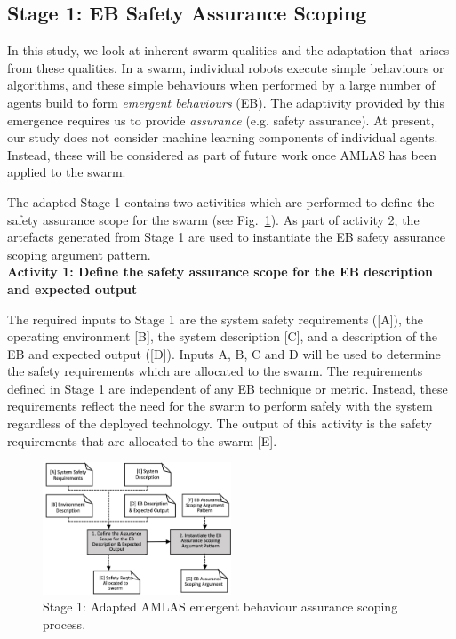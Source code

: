 \documentclass[lettersize,journal]{IEEEtran}
\begin{document}
\subsection{Stage 1: EB Safety Assurance Scoping} \label{framework-stage1}
In this study, we look at inherent swarm qualities and the adaptation that arises from these qualities. 
In a swarm, individual robots execute simple behaviours or algorithms, and these simple behaviours when performed by a large number of agents build to form \emph{emergent behaviours} (EB). 
The adaptivity provided by this emergence requires us to provide \textit{assurance} (e.g. safety assurance). 
At present, our study does not consider machine learning components of individual agents. Instead, these will be considered as part of future work once AMLAS has been applied to the swarm.

The adapted Stage 1 contains two activities which are performed to define the safety assurance scope for the swarm (see Fig.~\ref{amlas-a-stage1}).  
As part of activity 2, the artefacts generated from Stage 1 are used to instantiate the EB safety assurance scoping argument pattern. \\

\noindent \textbf{Activity 1: Define the safety assurance scope for the EB description and expected output}

The required inputs to Stage 1 are the system safety requirements ([A]), the operating environment [B], the system description [C], and a description of the EB and expected output ([D]). 
Inputs A, B, C and D will be used to determine the safety requirements which are allocated to the swarm. 
The requirements defined in Stage 1 are independent of any EB technique or metric.
Instead, these requirements reflect the need for the swarm to perform safely with the system regardless of the deployed technology. 
The output of this activity is the safety requirements that are allocated to the swarm [E]. 
\begin{figure}[!t]
	\centering
	\includegraphics[width=0.5\textwidth]{figures/amlas-a-stage1-v2.png}
	\caption{Stage 1: Adapted AMLAS emergent behaviour assurance scoping process.}
	\label{amlas-a-stage1}
\end{figure}
\\
\end{document}
